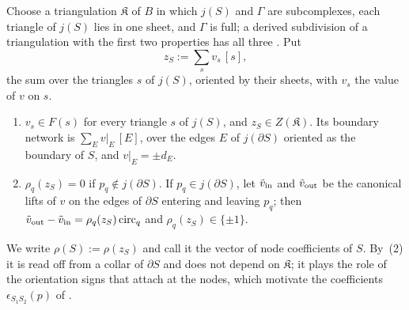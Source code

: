 Choose a triangulation $\mathfrak K$ of $B$ in which $j(S)$ and $\Gamma$ are subcomplexes, each triangle of $j(S)$ lies in
one sheet, and $\Gamma$ is full; a derived subdivision of a triangulation with the first two properties has all three
\cite[Ch.~3]{RS}. Put
\[
z_S:=\sum_{s}v_s\,[s],
\]
the sum over the triangles $s$ of $j(S)$, oriented by their sheets, with $v_s$ the value of $v$ on $s$.

\begin{lemma}\label{lem:lift}
\begin{enumerate}
\item $v_s\in F(s)$ for every triangle $s$ of $j(S)$, and $z_S\in Z(\mathfrak K)$. Its boundary network is
$\sum_Ev|_E\,[E]$, over the edges $E$ of $j(\partial S)$ oriented as the boundary of $S$, and $v|_E=\pm d_E$.
\item $\rho_q(z_S)=0$ if $p_q\notin j(\partial S)$. If $p_q\in j(\partial S)$, let $\tilde v_{\rm in}$ and $\tilde v_{\rm out}$
be the canonical lifts of $v$ on the edges of $\partial S$ entering and leaving $p_q$; then
$\tilde v_{\rm out}-\tilde v_{\rm in}=\rho_q(z_S)\,\mathrm{circ}_q$ and $\rho_q(z_S)\in\{\pm1\}$.
\end{enumerate}
\end{lemma}

We write $\rho(S):=\rho(z_S)$ and call it the vector of node coefficients of $S$. By~(2) it is read off from a collar of
$\partial S$ and does not depend on $\mathfrak K$; it plays the role of the orientation signs that \cite[\S9.5]{CBM} attach at
the nodes, which motivate the coefficients $\epsilon_{S_1S_2}(p)$ of \cite[Def.~8.1]{CBM}.


